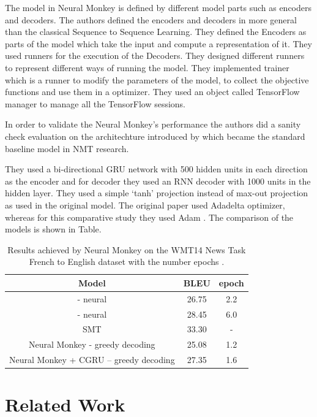 The model in Neural Monkey is defined by different model parts such as encoders and decoders. The authors defined the encoders and decoders in more general than the classical Sequence to Sequence Learning. They defined the Encoders as parts of the model which take the input and compute a representation of it. They used runners for the execution of the Decoders. They designed different runners to represent different ways of running the model. They implemented trainer which is a runner to modify the parameters of the model, to collect the objective functions and use them in a optimizer. They used an object called TensorFlow manager to manage all the TensorFlow sessions. 

In order to validate the Neural Monkey’s performance the authors did a sanity check evaluation on the architechture introduced by \cite{DBLP:journals/corr/BahdanauCB14} which became the standard baseline model in NMT research. 


They used a bi-directional GRU network with 500 hidden units in each direction as the encoder and for decoder they used an RNN decoder with 1000 units in the hidden layer. They used a simple ‘tanh’ projection instead of max-out projection as used in the original model. The original paper used Adadelta \citep {DBLP:journals/corr/abs-1212-5701} optimizer, whereas for this comparative study they used Adam \citep{DBLP:journals/corr/KingmaB14} . The comparison of the models is shown in Table. 

\begin{table}[h!]
\centering
 \begin{tabular}{ |c|c|c| } 
  \hline Model & BLEU & epoch \\ 
  \hline  \cite{DBLP:journals/corr/BahdanauCB14} - neural & 26.75 & 2.2\\
 \cite{DBLP:journals/corr/BahdanauCB14} - neural & 28.45 & 6.0\\
  SMT & 33.30 & -\\
  \hline Neural Monkey - greedy decoding & 25.08 & 1.2\\
  Neural Monkey + CGRU – greedy decoding  & 27.35 & 1.6\\
  \hline
 \end{tabular}
\caption{Results achieved by Neural Monkey on the WMT14 News Task French to English dataset with the number epochs \citep{neuralmonk}.}
\end{table}

\section{Related Work}

